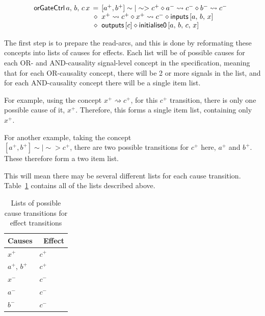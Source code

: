 \documentclass[british, journal]{IEEEtran}
\begin{document}
\vspace{-4mm}
\[
\begin{array}{lcl}
\hspace{-2mm}\mathsf{orGateCtrl}\,a,\,b,\,c\,x&\hspace{-2mm}=&\hspace{-2mm}[a^{+}, b^{+}]\sim|\sim>c^{+} 
\diamond a^{-}\rightsquigarrow c^{-} \diamond b^{-}\rightsquigarrow c^{-}\\
~&\hspace{-2mm}\diamond&\hspace{-2mm}x^{+}\rightsquigarrow c^{+} \diamond
x^{+}\rightsquigarrow c^{-} \diamond \mathsf{inputs} \, [a,\,b,\,x] \\
~&\hspace{-2mm}\diamond&\hspace{-2mm}\mathsf{outputs}\,[c]\diamond\mathsf{initialise0}\,[a,\,b,\,c,\,x]
\end{array}
\]

\noindent The first step is to prepare the read-arcs, and this is done by
reformating these concepts into lists of causes for effects.
Each list will be of possible causes for each OR- and AND-causality signal-level
concept in the specification, meaning that for each OR-causality concept, there will
be 2 or more signals in the list, and for each AND-causality concept there will be a single
item list. 

For example, using the concept $x^{+} \rightsquigarrow c^{+}$, for this $c^{+}$ transition,
there is only one possible cause of it, $x^{+}$. Therefore, this forms a single item list, 
containing only $x^{+}$.

For another example, taking the concept\\$[a^{+}, b^{+}]\sim|\sim>c^{+}$, there are
two possible transitions for $c^{+}$ here, $a^{+}$ and $b^{+}$. These therefore form 
a two item list. 

This will mean there may be several different lists for each cause transition. 
Table~\ref{tab:list-of-concepts} contains all of the lists described above.

\begin{table}[h]
\caption{Lists of possible cause transitions for effect transitions\label{tab:list-of-concepts}}

  \centering
\begin{tabular}[htb]{| m{2.6cm} | m{2.0cm} |}
  \hline
Causes & \, Effect \\ \hline \hline
$x^{+}$ & $c^{+}$ \\ \hline
$a^{+}$, $b^{+}$ & $c^{+}$ \\ \hline
$x^{-}$ & $c^{-}$ \\ \hline
$a^{-}$ & $c^{-}$ \\ \hline
$b^{-}$ & $c^{-}$ \\ \hline
  \end{tabular}
  \vspace{-3mm}
\end{table}
\end{document}
